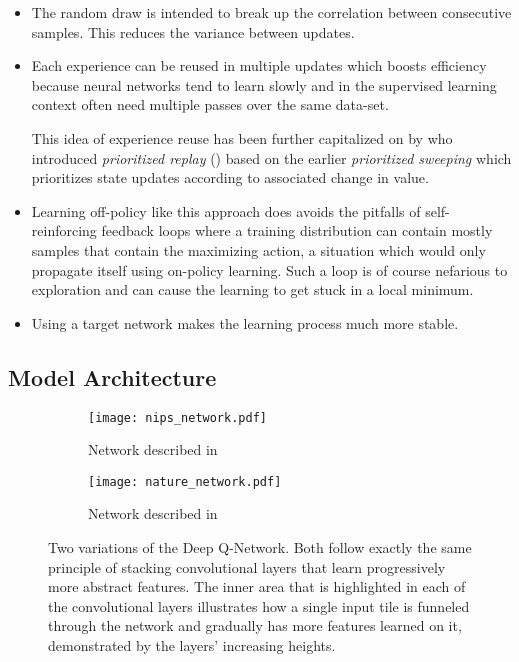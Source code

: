 \begin{itemize}
  \item The random draw is intended to break up the correlation
    between consecutive samples.
    This reduces the variance between updates.
  \item Each experience can be reused
    in multiple updates which boosts efficiency
    because neural networks tend to learn slowly
    and in the supervised learning context often need multiple passes
    over the same data-set.

    This idea of experience reuse has been further capitalized on by
    \citeauthor{Schaul2016} who introduced
    \textit{prioritized replay} (\citeyear{Schaul2016})
    based on the earlier \textit{prioritized sweeping} \parencite{Moore1993}
    which prioritizes state updates according to associated change in value.
  \item Learning off-policy like this approach does
    avoids the pitfalls of self-reinforcing feedback loops
    where a training distribution can contain mostly samples
    that contain the maximizing action,
    a situation which would only propagate itself using on-policy learning.
    Such a loop is of course nefarious to exploration
    and can cause the learning to get stuck in a local minimum.
  \item Using a target network makes the learning process much more stable.
\end{itemize}

\subsection{Model Architecture}
\label{sub:model_architecture}

\begin{figure}[h]
\center
\begin{subfigure}[b]{.49\textwidth}
  \centering
  \texttt{[image: nips\_network.pdf]}
  \vspace{.1\baselineskip}
  \caption{Network described in \cite{Mnih2013}}
  \label{fig:nips_network}
\end{subfigure}
\begin{subfigure}[b]{.49\textwidth}
  \centering
  \texttt{[image: nature\_network.pdf]}
  \vspace{.1\baselineskip}
  \caption{Network described in \cite{Mnih2015}}
  \label{fig:nature_network}
\end{subfigure}
\caption[Original Deep Q-Networks]{
Two variations of the Deep Q-Network.
Both follow exactly the same principle
of stacking convolutional layers
that learn progressively more abstract features.
The inner area that is highlighted in each of the convolutional layers
illustrates how a single input tile is funneled through the network
and gradually has more features learned on it,
demonstrated by the layers' increasing heights.
}
\label{fig:dqn_networks}
\end{figure}

